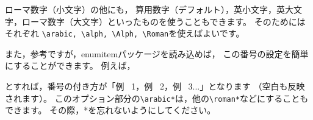 ローマ数字（小文字）の他にも，
算用数字（デフォルト），英小文字，英大文字，ローマ数字（大文字）といったものを使うこともできます。
そのためにはそれぞれ
\verb|\arabic, \alph, \Alph, \Roman|を使えばよいです。

また，参考ですが，enumitemパッケージを読み込めば，
この番号の設定を簡単にすることができます。
例えば，
\begin{ITeX}
\begin{enumerate}[label=例 \arabic*]
\end{ITeX}
とすれば，番号の付き方が「例 \ 1，例 \ 2，例 \ 3...」となります
（空白も反映されます）。
このオプション部分の\verb|\arabic*|は，他の\verb|\roman*|などにすることもできます。
その際，*を忘れないようにしてください。 

